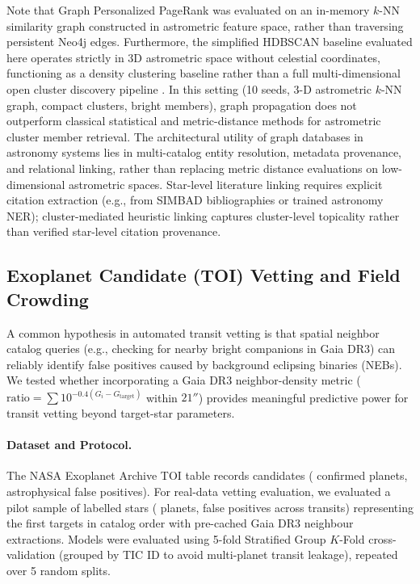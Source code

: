 \documentclass[preprint,12pt,authoryear]{elsarticle}
\begin{document}
Note that Graph Personalized PageRank was evaluated on an in-memory $k$-NN similarity graph constructed in astrometric feature space, rather than traversing persistent Neo4j edges. Furthermore, the simplified HDBSCAN baseline evaluated here operates strictly in 3D astrometric space without celestial coordinates, functioning as a density clustering baseline rather than a full multi-dimensional open cluster discovery pipeline \citep[e.g.,][]{Hunt2023}. In this setting (10 seeds, 3-D astrometric $k$-NN graph, compact clusters, bright members), graph propagation does not outperform classical statistical and metric-distance methods for astrometric cluster member retrieval. The architectural utility of graph databases in astronomy systems lies in multi-catalog entity resolution, metadata provenance, and relational linking, rather than replacing metric distance evaluations on low-dimensional astrometric spaces. Star-level literature linking requires explicit citation extraction (e.g., from SIMBAD bibliographies or trained astronomy NER); cluster-mediated heuristic linking captures cluster-level topicality rather than verified star-level citation provenance.

\subsection{Exoplanet Candidate (TOI) Vetting and Field Crowding}
\label{sec:toi_vetting}

A common hypothesis in automated transit vetting is that spatial neighbor catalog queries (e.g., checking for nearby bright companions in Gaia DR3) can reliably identify false positives caused by background eclipsing binaries (NEBs). We tested whether incorporating a Gaia DR3 neighbor-density metric ($\text{ratio} = \sum 10^{-0.4(G_i - G_{\mathrm{target}})}$ within $21''$) provides meaningful predictive power for transit vetting beyond target-star parameters.

\paragraph{Dataset and Protocol.}
The NASA Exoplanet Archive TOI table records \nTOICatalog{} candidates (\nTOICatalogPlanets{} confirmed planets, \nTOICatalogFP{} astrophysical false positives). For real-data vetting evaluation, we evaluated a pilot sample of \toiNStars{} labelled stars (\toiNPlanets{} planets, \toiNFP{} false positives across \toiNTransits{} transits) representing the first \toiNStars{} targets in catalog order with pre-cached Gaia DR3 neighbour extractions. Models were evaluated using 5-fold Stratified Group $K$-Fold cross-validation (grouped by TIC ID to avoid multi-planet transit leakage), repeated over 5 random splits.
\end{document}

